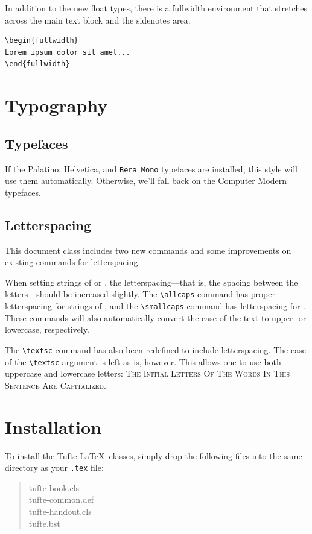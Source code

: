 \documentclass{tufte-handout}
\newcommand{\docenv}[1]{\textsf{#1}}%
\begin{document}
In addition to the new float types, there is a \docenv{fullwidth}
environment that stretches across the main text block and the sidenotes
area.

\begin{Verbatim}
\begin{fullwidth}
Lorem ipsum dolor sit amet...
\end{fullwidth}
\end{Verbatim}

\begin{fullwidth}
\small\itshape\lipsum[1]
\end{fullwidth}

\section{Typography}\label{sec:typography}

\subsection{Typefaces}\label{sec:typefaces}
If the Palatino, \textsf{Helvetica}, and \texttt{Bera Mono} typefaces are installed, this style
will use them automatically.  Otherwise, we'll fall back on the Computer Modern
typefaces.

\subsection{Letterspacing}\label{sec:letterspacing}
This document class includes two new commands and some improvements on
existing commands for letterspacing.

When setting strings of  or , the
letter\-spacing---that is, the spacing between the letters---should be
increased slightly.\cite{Bringhurst2005}  The \Verb|\allcaps| command has proper letterspacing for
strings of , and the \Verb|\smallcaps| command
has letterspacing for .  These commands
will also automatically convert the case of the text to upper- or
lowercase, respectively.

The \Verb|\textsc| command has also been redefined to include
letterspacing.  The case of the \Verb|\textsc| argument is left as is,
however.  This allows one to use both uppercase and lowercase letters:
\textsc{The Initial Letters Of The Words In This Sentence Are Capitalized.}



\section{Installation}\label{sec:installation}
To install the Tufte-\LaTeX\ classes, simply drop the
following files into the same directory as your \texttt{.tex}
file:
\begin{quote}
  \ttfamily
  tufte-book.cls\\
  tufte-common.def\\
  tufte-handout.cls\\
  tufte.bst
\end{quote}
\end{document}
